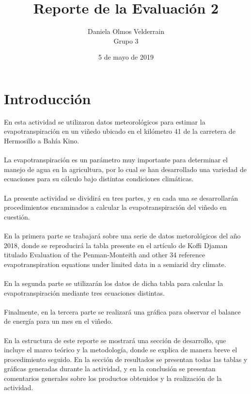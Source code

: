 \documentclass[letterpaper,12pt]{article}
\begin{document}
\title{Reporte de la Evaluación 2}
\author{Daniela Olmos Velderrain\\Grupo 3}
\date{5 de mayo de 2019}

\maketitle

\section{Introducción}
En esta actividad se utilizaron datos meteorológicos para estimar la evapotranspiración en un viñedo ubicado en el kilómetro 41 de la carretera de Hermosillo a Bahía Kino.\\\\
La evapotranspiración es un parámetro muy importante para determinar el manejo de agua en la agricultura, por lo cual se han desarrollado una variedad de ecuaciones para su cálculo bajo distintas condiciones climáticas. \\\\
La presente actividad se dividirá en tres partes, y en cada una se desarrollarán procedimientos encaminados a calcular la evapotranspiración del viñedo en cuestión. \\\\
En la primera parte se trabajará sobre una serie de datos metorológicos del año 2018, donde se reproducirá la tabla presente en el artículo de Koffi Djaman titulado Evaluation of the Penman-Monteith and other 34 reference evapotranspiration equations under limited data in a semiarid dry climate.
\\\\
En la segunda parte se utilizarán los datos de dicha tabla para calcular la evapotranspiración mediante tres ecuaciones distintas.
\\\\
Finalmente, en la tercera parte se realizará una gráfica para observar el balance de energía para un mes en el viñedo. 
\\\\
En la estructura de este reporte se mostrará una sección de desarrollo, que incluye el marco teórico y la metodología, donde se explica de manera breve el procedimiento seguido. En la sección de resultados se presentan todas las tablas y gráficas generadas durante la actividad, y en la conclusión se presentan comentarios generales sobre los productos obtenidos y la realización de la actividad.
    
\end{document}
